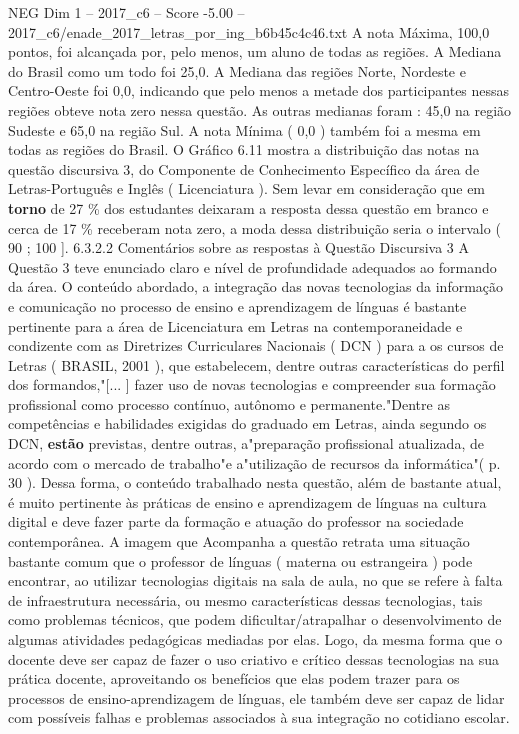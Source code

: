 \begin{textsample}{NEG Dim 1 – 2017\_c6 – Score -5.00 – 2017\_c6/enade\_2017\_letras\_por\_ing\_b6b45c4c46.txt}
A nota Máxima, 100,0 pontos, foi alcançada por, pelo menos, um aluno de todas as regiões.
A Mediana do Brasil como um todo foi 25,0.
A Mediana das regiões Norte, Nordeste e Centro-Oeste foi 0,0, indicando que pelo menos a metade dos participantes nessas regiões obteve nota zero nessa questão.
As outras medianas foram : 45,0 na região Sudeste e 65,0 na região Sul.
A nota Mínima ( 0,0 ) também foi a mesma em todas as regiões do Brasil.
O Gráfico 6.11 mostra a distribuição das notas na questão discursiva 3, do Componente de Conhecimento Específico da área de Letras-Português e Inglês ( Licenciatura ).
Sem levar em consideração que em \textbf{torno} de 27 \% dos estudantes deixaram a resposta dessa questão em branco e cerca de 17 \% receberam nota zero, a moda dessa distribuição seria o intervalo ( 90 ; 100 ]. 6.3.2.2 Comentários sobre as respostas à Questão Discursiva 3 A Questão 3 teve enunciado claro e nível de profundidade adequados ao formando da área.
O conteúdo abordado, a integração das novas tecnologias da informação e comunicação no processo de ensino e aprendizagem de línguas é bastante pertinente para a área de Licenciatura em Letras na contemporaneidade e condizente com as Diretrizes Curriculares Nacionais ( DCN ) para a os cursos de Letras ( BRASIL, 2001 ), que estabelecem, dentre outras características do perfil dos formandos,"[... ] fazer uso de novas tecnologias e compreender sua formação profissional como processo contínuo, autônomo e permanente."Dentre as competências e habilidades exigidas do graduado em Letras, ainda segundo os DCN, \textbf{estão} previstas, dentre outras, a"preparação profissional atualizada, de acordo com o mercado de trabalho"e a"utilização de recursos da informática"( p. 30 ).
Dessa forma, o conteúdo trabalhado nesta questão, além de bastante atual, é muito pertinente às práticas de ensino e aprendizagem de línguas na cultura digital e deve fazer parte da formação e atuação do professor na sociedade contemporânea.
A imagem que Acompanha a questão retrata uma situação bastante comum que o professor de línguas ( materna ou estrangeira ) pode encontrar, ao utilizar tecnologias digitais na sala de aula, no que se refere à falta de infraestrutura necessária, ou mesmo características dessas tecnologias, tais como problemas técnicos, que podem dificultar/atrapalhar o desenvolvimento de algumas atividades pedagógicas mediadas por elas.
Logo, da mesma forma que o docente deve ser capaz de fazer o uso criativo e crítico dessas tecnologias na sua prática docente, aproveitando os benefícios que elas podem trazer para os processos de ensino-aprendizagem de línguas, ele também deve ser capaz de lidar com possíveis falhas e problemas associados à sua integração no cotidiano escolar.

\end{textsample}
